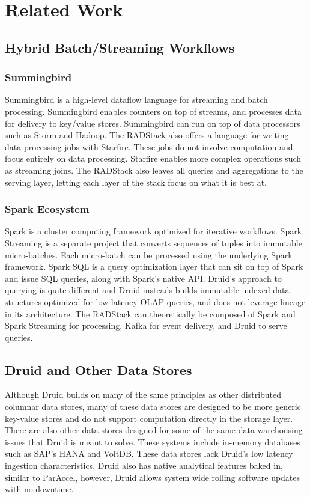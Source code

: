\documentclass{vldb}
\begin{document}
{\section{Related Work}
\label{sec:related}

\subsection{Hybrid Batch/Streaming Workflows}

\subsubsection{Summingbird}
Summingbird\cite{boykin2014summingbird} is a high-level dataflow language for
streaming and batch processing. Summingbird enables counters on top of streams,
and processes data for delivery to key/value stores. Summingbird can run on top
of data processors such as Storm\cite{marz2013storm} and Hadoop. The RADStack
also offers a language for writing data processing jobs with Starfire. These
jobs do not involve computation and focus entirely on data processing. Starfire
enables more complex operations such as streaming joins. The RADStack also 
leaves all queries and aggregations to the serving layer, letting each layer of
the stack focus on what it is best at.

\subsubsection{Spark Ecosystem}
Spark\cite{zaharia2012resilient} is a cluster computing framework optimized for
iterative workflows.  Spark Streaming is a separate project that converts
sequences of tuples into immutable micro-batches. Each micro-batch can be
processed using the underlying Spark framework. Spark SQL is a query
optimization layer that can sit on top of Spark and issue SQL queries, along
with Spark’s native API.  Druid’s approach to querying is quite
different and Druid insteads builds immutable indexed data structures optimized
for low latency OLAP queries, and does not leverage lineage in its architecture.
The RADStack can theoretically be composed of Spark and Spark Streaming for
processing, Kafka for event delivery, and Druid to serve queries.

\subsection{Druid and Other Data Stores}
Although Druid builds on many of the same principles as other distributed
columnar data stores\cite{fink2012distributed}, many of these data stores are
designed to be more generic key-value stores\cite{lakshman2010cassandra} and do
not support computation directly in the storage layer. There are also other
data stores designed for some of the same data warehousing issues that Druid is
meant to solve. These systems include in-memory databases such as SAP’s
HANA\cite{farber2012sap} and VoltDB\cite{voltdb2010voltdb}. These data stores
lack Druid’s low latency ingestion characteristics. Druid also has native
analytical features baked in, similar to ParAccel\cite{paraccel2013}, however,
Druid allows system wide rolling software updates with no downtime. 

}
\end{document}
